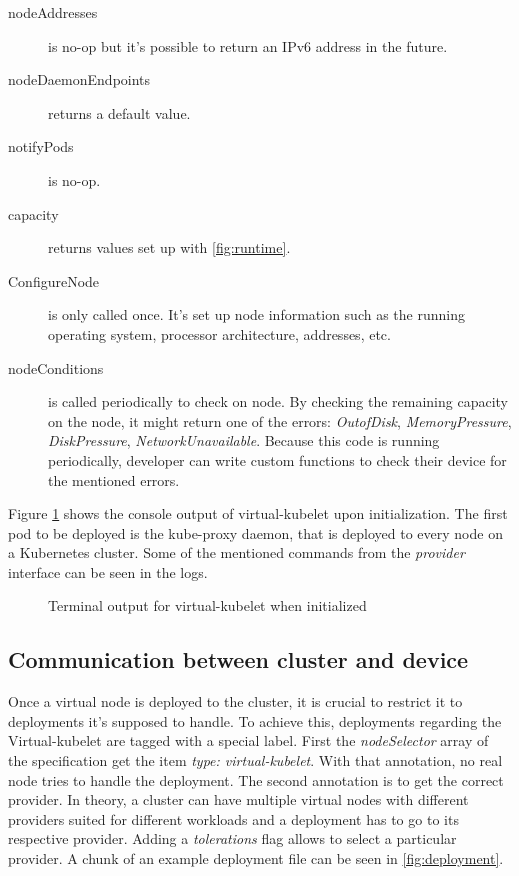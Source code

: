 \begin{description}
  \item [nodeAddresses] is no-op but it's possible to return an IPv6 address in the future.
  \item [nodeDaemonEndpoints] returns a default value.
  \item [notifyPods] is no-op.
  \item [capacity] returns values set up with \ref{fig:runtime}.
  \item [ConfigureNode] is only called once. It's set up node information such as the running operating system, processor architecture, addresses, etc.
  \item [nodeConditions] is called periodically to check on node. By checking the remaining capacity on the node, it might return one of the errors: \textit{OutofDisk}, \textit{MemoryPressure}, \textit{DiskPressure}, \textit{NetworkUnavailable}. Because this code is running periodically, developer can write custom functions to check their device for the mentioned errors.
  \end{description}

  Figure \ref{fig:output} shows the console output of virtual-kubelet upon initialization. The first pod to be deployed is the kube-proxy daemon, that is deployed to every node on a Kubernetes cluster. Some of the mentioned commands from the \textit{provider} interface can be seen in the logs.

\begin{figure}[!h]
  \centering
  \caption{Terminal output for virtual-kubelet when initialized} \label{fig:output}
\end{figure}

\subsection{Communication between cluster and device}
Once a virtual node is deployed to the cluster, it is crucial to restrict it to deployments it's supposed to handle. To achieve this, deployments regarding the Virtual-kubelet are tagged with a special label. First the \textit{nodeSelector} array of the specification get the item \textit{type: virtual-kubelet}. With that annotation, no real node tries to handle the deployment. The second annotation is to get the correct provider. In theory, a cluster can have multiple virtual nodes with different providers suited for different workloads and a deployment has to go to its respective provider. Adding a \textit{tolerations} flag allows to select a particular provider. A chunk of an example deployment file can be seen in \ref{fig:deployment}.

